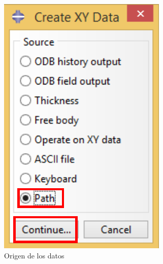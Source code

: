 \begin{enumerate}
\begin{figure}[H]
\begin{subfigure}{0.30\textwidth}
    \includegraphics[width=\textwidth]{./body/images/imagen105.pdf}
    \caption{Origen de los datos}
    \label{figu105}
  \end{subfigure}%
  ~ %
  \begin{subfigure}{0.39\textwidth}

\end{subfigure}
\end{figure}
\end{enumerate}
